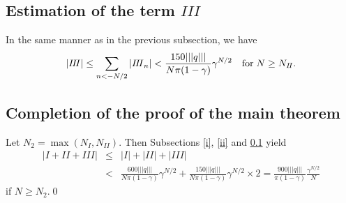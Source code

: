 \subsection{Estimation of the term $I\!I\!I$}
\label{iii}
In the same manner as in the previous subsection, we have
\begin{displaymath}
|I\!I\!I| \le \sum_{n<-N/2}|{I\!I\!I}_n| < \frac{150|||q|||}{N\pi(1-\gamma)}\gamma^{N/2} \quad {\rm for}\; N \ge N_{I\!I}.
\end{displaymath}

\subsection{Completion of the proof of the main theorem}
Let $N_2 = \max(N_I,N_{I\!I})$. Then Subsections \ref{i}, \ref{ii} and \ref{iii} yield
\begin{eqnarray*}
\left|I+{I\!I}+{I\!I\!I}\right| &\le& \left|I\right|+\left|{I\!I}\right|+\left|{I\!I\!I}\right| \\
&<& \displaystyle \frac{600|||q|||}{N\pi(1-\gamma)}\gamma^{N/2} + \frac{150|||q|||}{N\pi(1-\gamma)}\gamma^{N/2} \times 2 
= \displaystyle \frac{900|||q|||}{\pi(1-\gamma)}\frac{\gamma^{N/2}}{N}
\label{BL}
\end{eqnarray*}
if $N\ge N_2$.\qed

